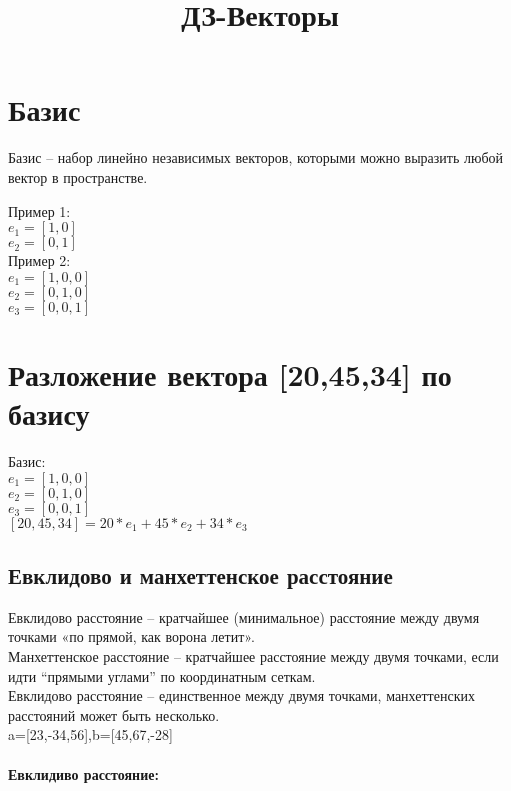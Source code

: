 \documentclass{article}
\title{ДЗ-Векторы}
\begin{document}
\maketitle

\section{Базис}

Базис – набор линейно независимых векторов, которыми можно выразить любой вектор в пространстве.

Пример 1:\\
$e_{1}=[1,0]$\\
$e_{2}=[0,1]$\\

Пример 2:\\
$e_{1}=[1,0,0]$\\
$e_{2}=[0,1,0]$\\
$e_{3}=[0,0,1]$\\

\section{Разложение вектора [20,45,34] по базису}

Базис:\\
$e_{1}=[1,0,0]$ \\
$e_{2}=[0,1,0]$ \\
$e_{3}=[0,0,1]$ \\

$[20,45,34] = 20*e_{1}+45*e_{2}+34*e_{3}$
\subsection{Евклидово и манхеттенское расстояние}

Евклидово расстояние – кратчайшее (минимальное) расстояние между двумя точками «по прямой, как ворона летит».\\

Манхеттенское расстояние – кратчайшее расстояние между двумя точками, если идти “прямыми углами” по координатным сеткам.\\

Евклидово расстояние – единственное между двумя точками, манхеттенских расстояний может быть несколько.\\

a=[23,-34,56],b=[45,67,-28]

\paragraph{Евклидиво расстояние:}
\end{document}
